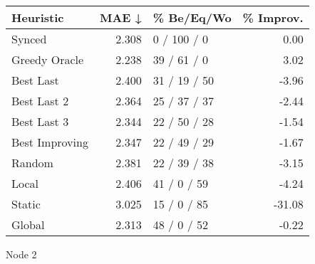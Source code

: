 \begin{tabular}{lrlr}
\toprule
\textbf{Heuristic} & \textbf{MAE ↓} & \textbf{\% Be/Eq/Wo} & \textbf{\% Improv.} \\
\midrule
            Synced &          2.308 &          0 / 100 / 0 &                0.00 \\
     Greedy Oracle &          2.238 &          39 / 61 / 0 &                3.02 \\
         Best Last &          2.400 &         31 / 19 / 50 &               -3.96 \\
       Best Last 2 &          2.364 &         25 / 37 / 37 &               -2.44 \\
       Best Last 3 &          2.344 &         22 / 50 / 28 &               -1.54 \\
    Best Improving &          2.347 &         22 / 49 / 29 &               -1.67 \\
            Random &          2.381 &         22 / 39 / 38 &               -3.15 \\
             Local &          2.406 &          41 / 0 / 59 &               -4.24 \\
            Static &          3.025 &          15 / 0 / 85 &              -31.08 \\
            Global &          2.313 &          48 / 0 / 52 &               -0.22 \\
\bottomrule
\end{tabular}
\caption{Node 2}
\label{tab:hr_iid_lr05_le1_bs2_2}
